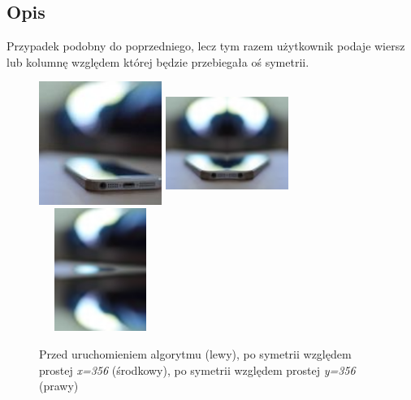 \documentclass[a4paper,12pt]{book}
\begin{document}
\subsection*{Opis}
Przypadek podobny do poprzedniego, lecz tym razem użytkownik podaje wiersz lub kolumnę względem której będzie przebiegała oś symetrii. 
\begin{figure}[H]
	\caption{Przed uruchomieniem algorytmu (lewy), po symetrii względem prostej \textit{x=356} (środkowy), po symetrii względem prostej \textit{y=356} (prawy)}
	\includegraphics[width=4cm, height=4cm]{phone-unmodified.jpg}
	\includegraphics[width=4cm, height=4cm]{phone-custom-symmetry-x.png}
	\includegraphics[width=4cm, height=4cm]{phone-custom-symmetry-y.png}
\end{figure}
\end{document}
